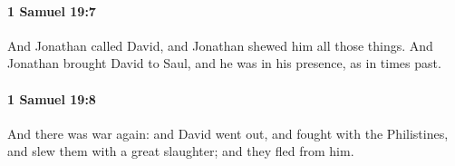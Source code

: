 		\paragraph{1 Samuel 19:7} %
			\label{1SAMUEL-19-7}

			And Jonathan called David, and Jonathan shewed him all those things. And Jonathan brought David to Saul, and he was in his presence, as in times past.


		\paragraph{1 Samuel 19:8} %
			\label{1SAMUEL-19-8}

			And there was war again: and David went out, and fought with the Philistines, and slew them with a great slaughter; and they fled from him.


